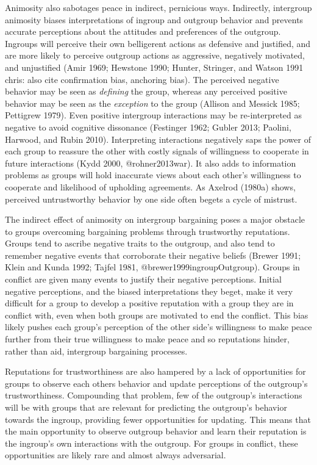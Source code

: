 \documentclass[11pt]{article}
\begin{document}
Animosity also sabotages peace in indirect, pernicious ways. Indirectly,
intergroup animosity biases interpretations of ingroup and outgroup
behavior and prevents accurate perceptions about the attitudes and
preferences of the outgroup. Ingroups will perceive their own
belligerent actions as defensive and justified, and are more likely to
perceive outgroup actions as aggressive, negatively motivated, and
unjustified (Amir 1969; Hewstone 1990; Hunter, Stringer, and Watson 1991
chris: also cite confirmation bias, anchoring bias). The perceived
negative behavior may be seen as \emph{defining} the group, whereas any
perceived positive behavior may be seen as the \emph{exception} to the
group (Allison and Messick 1985; Pettigrew 1979). Even positive
intergroup interactions may be re-interpreted as negative to avoid
cognitive dissonance (Festinger 1962; Gubler 2013; Paolini, Harwood, and
Rubin 2010). Interpreting interactions negatively saps the power of each
group to reassure the other with costly signals of willingness to
cooperate in future interactions (Kydd 2000, @rohner2013war). It also
adds to information problems as groups will hold inaccurate views about
each other's willingness to cooperate and likelihood of upholding
agreements. As Axelrod (1980a) shows, perceived untrustworthy behavior
by one side often begets a cycle of mistrust.

The indirect effect of animosity on intergroup bargaining poses a major
obstacle to groups overcoming bargaining problems through trustworthy
reputations. Groups tend to ascribe negative traits to the outgroup, and
also tend to remember negative events that corroborate their negative
beliefs (Brewer 1991; Klein and Kunda 1992; Tajfel 1981,
@brewer1999ingroupOutgroup). Groups in conflict are given many events to
justify their negative perceptions. Initial negative perceptions, and
the biased interpretations they beget, make it very difficult for a
group to develop a positive reputation with a group they are in conflict
with, even when both groups are motivated to end the conflict. This bias
likely pushes each group's perception of the other side's willingness to
make peace further from their true willingness to make peace and so
reputations hinder, rather than aid, intergroup bargaining processes.

Reputations for trustworthiness are also hampered by a lack of
opportunities for groups to observe each others behavior and update
perceptions of the outgroup's trustworthiness. Compounding that problem,
few of the outgroup's interactions will be with groups that are relevant
for predicting the outgroup's behavior towards the ingroup, providing
fewer opportunities for updating. This means that the main opportunity
to observe outgroup behavior and learn their reputation is the ingroup's
own interactions with the outgroup. For groups in conflict, these
opportunities are likely rare and almost always adversarial.
\end{document}
